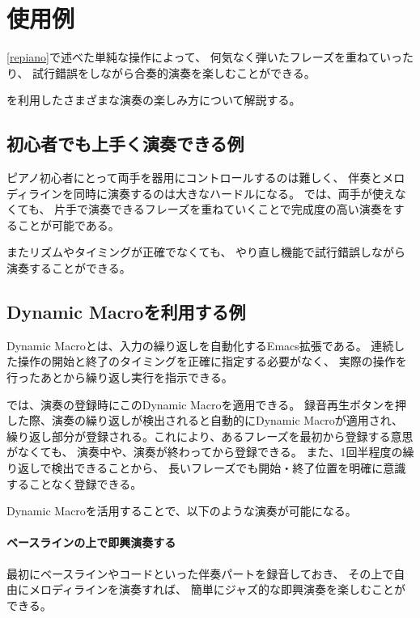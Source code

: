 \section{{\system}使用例}

\ref{repiano}で述べた単純な操作によって、
何気なく弾いたフレーズを重ねていったり、
試行錯誤をしながら合奏的演奏を楽しむことができる。

{\system}を利用したさまざまな演奏の楽しみ方について解説する。

\subsection{初心者でも上手く演奏できる例}
ピアノ初心者にとって両手を器用にコントロールするのは難しく、
伴奏とメロディラインを同時に演奏するのは大きなハードルになる。
{\system}では、両手が使えなくても、
片手で演奏できるフレーズを重ねていくことで完成度の高い演奏をすることが可能である。

またリズムやタイミングが正確でなくても、
やり直し機能で試行錯誤しながら演奏することができる。


\subsection{Dynamic Macroを利用する例}
Dynamic Macroとは、入力の繰り返しを自動化するEmacs拡張である。
連続した操作の開始と終了のタイミングを正確に指定する必要がなく、
実際の操作を行ったあとから繰り返し実行を指示できる。

{\system}では、演奏の登録時にこのDynamic Macroを適用できる。
録音再生ボタンを押した際、演奏の繰り返しが検出されると自動的にDynamic Macroが適用され、
繰り返し部分が登録される。これにより、あるフレーズを最初から登録する意思がなくても、
演奏中や、演奏が終わってから登録できる。
また、1回半程度の繰り返しで検出できることから、
長いフレーズでも開始・終了位置を明確に意識することなく登録できる。

Dynamic Macroを活用することで、以下のような演奏が可能になる。

\paragraph*{ベースラインの上で即興演奏する}
最初にベースラインやコードといった伴奏パートを録音しておき、
その上で自由にメロディラインを演奏すれば、
簡単にジャズ的な即興演奏を楽しむことができる。

